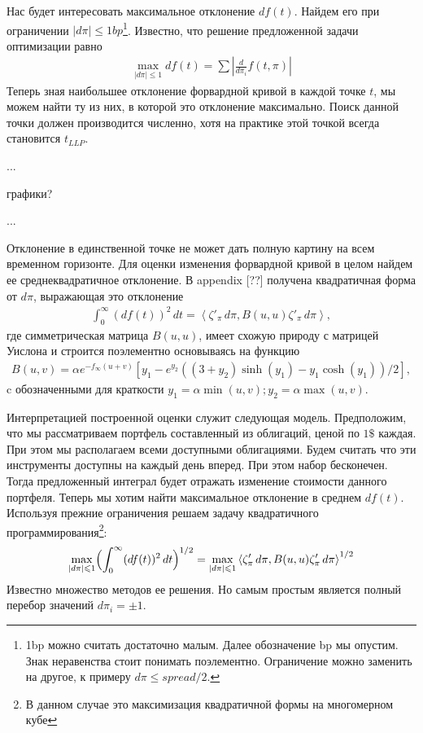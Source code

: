 \documentclass[10pt]{article}
\theoremstyle{definition}
\theoremstyle{remark}
\theoremstyle{plain}
\newcommand{\w}{f_\infty}
\newcommand{\scalar}[2]{\left<#1,#2\right>}
\begin{document}
Нас будет интересовать максимальное отклонение $df(t)$. Найдем его при ограничении $|d\pi| \leqslant 1bp$\footnote{1bp можно считать достаточно малым. Далее обозначение bp мы опустим. Знак неравенства стоит понимать поэлементно. Ограничение можно заменить на другое, к примеру $d\pi \leqslant spread/2$.}. Известно, что решение предложенной задачи оптимизации равно
\begin{align*}
\max\limits_{|d\pi| \leqslant 1} df(t) = \sum\left|\frac{d}{d\pi_i}f(t,\pi)\right|
\end{align*}
Теперь зная наибольшее отклонение форвардной кривой в каждой точке $t$, мы можем найти ту из них, в которой это отклонение максимально. Поиск данной точки должен производится численно, хотя на практике этой точкой всегда становится $t_{LLP}$. 

...

графики?

...

Отклонение в единственной точке не может дать полную картину на всем временном горизонте. Для оценки изменения форвардной кривой в целом найдем ее среднеквадратичное отклонение. В appendix [??] получена квадратичная форма от $d\pi$, выражающая это отклонение
\begin{align*}
\int_0^{\infty}(df(t))^2\,dt = \scalar{\zeta'_\pi\,d\pi}{B(u,u)\zeta'_{\pi}\,d\pi},
\end{align*}
где симметрическая матрица $B(u,u)$, имеет схожую природу с матрицей Уислона и строится поэлементно основываясь на функцию 
\begin{align*}
B(u,v) = \alpha e^{-\w(u+v)}\left[y_1 - e^{y_2} \left((3+y_2)\sinh(y_1) - y_1 \cosh(y_1)\right)/2\right],
\end{align*}
c обозначенными для краткости $y_1 = \alpha\min(u,v); y_2 = \alpha\max(u,v)$. 

Интерпретацией построенной оценки служит следующая модель. Предположим, что мы рассматриваем портфель составленный из облигаций, ценой по $1\$ $ каждая. При этом мы располагаем всеми доступными облигациями. Будем считать что эти инструменты доступны на каждый день вперед. При этом набор бесконечен. Тогда предложенный интеграл будет отражать изменение стоимости данного портфеля. 
Теперь  мы хотим найти максимальное отклонение в среднем $df(t)$. Используя прежние ограничения решаем задачу квадратичного программирования\footnote{В данном случае это максимизация квадратичной формы на многомерном кубе}:
\begin{align}
\max\limits_{|d\pi| \leqslant 1} \Bigl(\int_0^{\infty}(df(t))^2\,dt\Bigr)^{1/2}
= \max\limits_{|d\pi| \leqslant 1} \scalar{\zeta'_\pi\,d\pi}{B(u,u)\zeta'_{\pi}\,d\pi}^{1/2}
\end{align}
Известно множество методов ее решения. Но самым простым является полный перебор значений $d\pi_i=\pm 1$.
\end{document}
